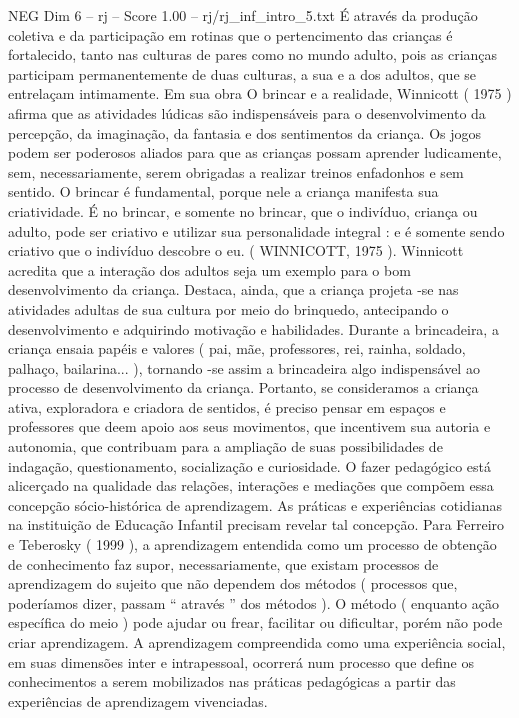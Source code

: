 \begin{textsample}{NEG Dim 6 – rj – Score 1.00 – rj/rj\_inf\_intro\_5.txt}
É através da produção coletiva e da participação em rotinas que o pertencimento das crianças é fortalecido, tanto nas culturas de pares como no mundo adulto, pois as crianças participam permanentemente de duas culturas, a sua e a dos adultos, que se entrelaçam intimamente.
Em sua obra O brincar e a realidade, Winnicott ( 1975 ) afirma que as atividades lúdicas são indispensáveis para o desenvolvimento da percepção, da imaginação, da fantasia e dos sentimentos da criança.
Os jogos podem ser poderosos aliados para que as crianças possam aprender ludicamente, sem, necessariamente, serem obrigadas a realizar treinos enfadonhos e sem sentido.
O brincar é fundamental, porque nele a criança manifesta sua criatividade.
É no brincar, e somente no brincar, que o indivíduo, criança ou adulto, pode ser criativo e utilizar sua personalidade integral : e é somente sendo criativo que o indivíduo descobre o eu. ( WINNICOTT, 1975 ).
Winnicott acredita que a interação dos adultos seja um exemplo para o bom desenvolvimento da criança.
Destaca, ainda, que a criança projeta -se nas atividades adultas de sua cultura por meio do brinquedo, antecipando o desenvolvimento e adquirindo motivação e habilidades.
Durante a brincadeira, a criança ensaia papéis e valores ( pai, mãe, professores, rei, rainha, soldado, palhaço, bailarina... ), tornando -se assim a brincadeira algo indispensável ao processo de desenvolvimento da criança.
Portanto, se consideramos a criança ativa, exploradora e criadora de sentidos, é preciso pensar em espaços e professores que deem apoio aos seus movimentos, que incentivem sua autoria e autonomia, que contribuam para a ampliação de suas possibilidades de indagação, questionamento, socialização e curiosidade.
O fazer pedagógico está alicerçado na qualidade das relações, interações e mediações que compõem essa concepção sócio-histórica de aprendizagem.
As práticas e experiências cotidianas na instituição de Educação Infantil precisam revelar tal concepção.
Para Ferreiro e Teberosky ( 1999 ), a aprendizagem entendida como um processo de obtenção de conhecimento faz supor, necessariamente, que existam processos de aprendizagem do sujeito que não dependem dos métodos ( processos que, poderíamos dizer, passam “ através ” dos métodos ).
O método ( enquanto ação específica do meio ) pode ajudar ou frear, facilitar ou dificultar, porém não pode criar aprendizagem.
A aprendizagem compreendida como uma experiência social, em suas dimensões inter e intrapessoal, ocorrerá num processo que define os conhecimentos a serem mobilizados nas práticas pedagógicas a partir das experiências de aprendizagem vivenciadas.

\end{textsample}
